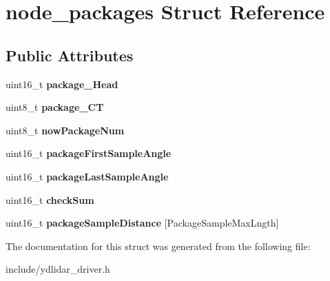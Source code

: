 \hypertarget{structnode__packages}{}\section{node\+\_\+packages Struct Reference}
\label{structnode__packages}
\subsection*{Public Attributes}
\begin{DoxyCompactItemize}
\item 
uint16\+\_\+t {\bfseries package\+\_\+\+Head}\hypertarget{structnode__packages_a1ed3121fde426c16fe5b5e8fac3c5431}{}\label{structnode__packages_a1ed3121fde426c16fe5b5e8fac3c5431}

\item 
uint8\+\_\+t {\bfseries package\+\_\+\+CT}\hypertarget{structnode__packages_a3365c5aeb9c44c7e7645fd056669437b}{}\label{structnode__packages_a3365c5aeb9c44c7e7645fd056669437b}

\item 
uint8\+\_\+t {\bfseries now\+Package\+Num}\hypertarget{structnode__packages_a7fc929fc56aa18d2229343e1c4079477}{}\label{structnode__packages_a7fc929fc56aa18d2229343e1c4079477}

\item 
uint16\+\_\+t {\bfseries package\+First\+Sample\+Angle}\hypertarget{structnode__packages_a48780f8343011c26cfa69bc0bcfb98d0}{}\label{structnode__packages_a48780f8343011c26cfa69bc0bcfb98d0}

\item 
uint16\+\_\+t {\bfseries package\+Last\+Sample\+Angle}\hypertarget{structnode__packages_a767062914a931ffc4ffc62292bdca610}{}\label{structnode__packages_a767062914a931ffc4ffc62292bdca610}

\item 
uint16\+\_\+t {\bfseries check\+Sum}\hypertarget{structnode__packages_a8ccc72e7cab7a3d4765ab5cc20097d41}{}\label{structnode__packages_a8ccc72e7cab7a3d4765ab5cc20097d41}

\item 
uint16\+\_\+t {\bfseries package\+Sample\+Distance} \mbox{[}Package\+Sample\+Max\+Lngth\mbox{]}\hypertarget{structnode__packages_a82b44c4cd7adf4f3c7923112b5438b0f}{}\label{structnode__packages_a82b44c4cd7adf4f3c7923112b5438b0f}

\end{DoxyCompactItemize}


The documentation for this struct was generated from the following file\+:\begin{DoxyCompactItemize}
\item 
include/ydlidar\+\_\+driver.\+h\end{DoxyCompactItemize}
